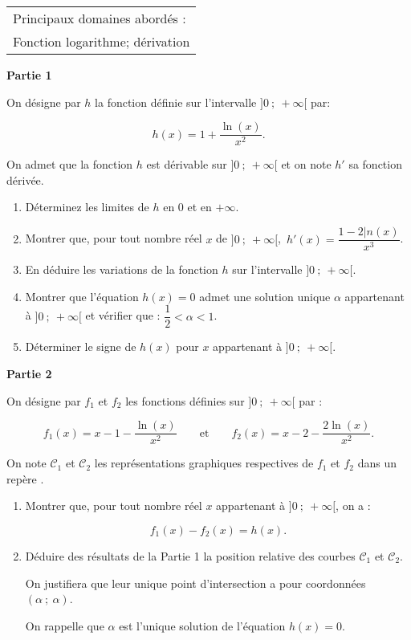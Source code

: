 
\smallskip

\begin{tabular}{|l|}\hline
Principaux domaines abordés :\\
Fonction logarithme; dérivation\\ \hline
\end{tabular}

\begin{center}\textbf{Partie 1}\end{center}

On désigne par $h$ la fonction définie sur l'intervalle $]0~;~ +\infty[$ par:

\[h(x) = 1 + \dfrac{\ln (x)}{x^2}.\]

On admet que la fonction $h$ est dérivable sur $]0~;~ +\infty[$ et on note $h'$ sa fonction dérivée.

\medskip

\begin{enumerate}
\item Déterminez les limites de $h$ en $0$ et en $+ \infty$.
\item Montrer que, pour tout nombre réel $x$ de $]0~;~ +\infty[$,\, $h'(x) = \dfrac{1 - 2|n (x)}{x^3}$.
\item En déduire les variations de la fonction $h$ sur l'intervalle $]0~;~ +\infty[$.
\item Montrer que l'équation $h(x) = 0$ admet une solution unique $\alpha$ appartenant à $]0~;~ +\infty[$ et vérifier que : $\dfrac{1}{2} < \alpha < 1$.
\item Déterminer le signe de $h(x)$ pour $x$ appartenant à $]0~;~ +\infty[$.
\end{enumerate}

\bigskip

\begin{center}\textbf{Partie 2}\end{center}

On désigne par $f_1$ et $f_2$ les fonctions définies sur $]0~;~ +\infty[$ par :

\[f_1(x) = x-1 - \dfrac{\ln (x)}{x^2}\qquad \text{et}\qquad f_2(x) = x - 2 - \dfrac{2\ln (x)}{x^2}.\]

On note $\mathcal{C}_1$ et $\mathcal{C}_2$ les représentations graphiques respectives de $f_1$ et $f_2$ dans un repère \Oij.

\medskip

\begin{enumerate}
\item Montrer que, pour tout nombre réel $x$ appartenant à $]0~;~ +\infty[$, on a : 

\[f_1(x) - f_2(x) = h(x).\]

\item Déduire des résultats de la Partie 1 la position relative des courbes $\mathcal{C}_1$ et $\mathcal{C}_2$.

On justifiera que leur unique point d'intersection a pour coordonnées $(\alpha~;~\alpha)$.

On rappelle que $\alpha$ est l'unique solution de l'équation $h(x) = 0$.
\end{enumerate}

\bigskip

